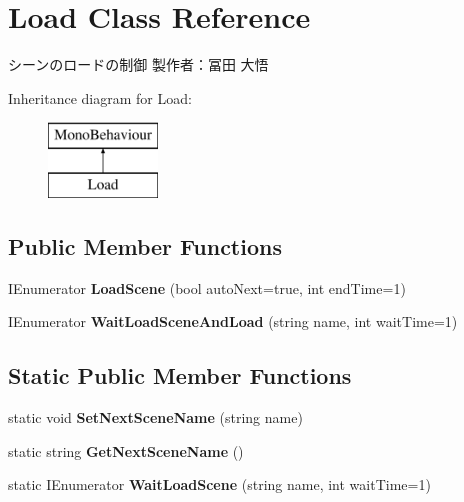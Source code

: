 \hypertarget{class_load}{}\section{Load Class Reference}
\label{class_load}


シーンのロードの制御 製作者：冨田 大悟  


Inheritance diagram for Load\+:\begin{figure}[H]
\begin{center}
\leavevmode
\includegraphics[height=2.000000cm]{class_load}
\end{center}
\end{figure}
\subsection*{Public Member Functions}
\begin{DoxyCompactItemize}
\item 
\mbox{\label{class_load_a7af602b60c474fa811bd43e5f568cd08}} 
I\+Enumerator {\bfseries Load\+Scene} (bool auto\+Next=true, int end\+Time=1)
\item 
\mbox{\label{class_load_a417073d3057d33312265dfc53af36f28}} 
I\+Enumerator {\bfseries Wait\+Load\+Scene\+And\+Load} (string name, int wait\+Time=1)
\end{DoxyCompactItemize}
\subsection*{Static Public Member Functions}
\begin{DoxyCompactItemize}
\item 
\mbox{\label{class_load_a533967a89a8fd10c5ba9bb50136d78ac}} 
static void {\bfseries Set\+Next\+Scene\+Name} (string name)
\item 
\mbox{\label{class_load_ac054f09dfb8453dd520f30329595da90}} 
static string {\bfseries Get\+Next\+Scene\+Name} ()
\item 
\mbox{\label{class_load_aca0a309a283e4535c841417770aa7ee6}} 
static I\+Enumerator {\bfseries Wait\+Load\+Scene} (string name, int wait\+Time=1)
\end{DoxyCompactItemize}
